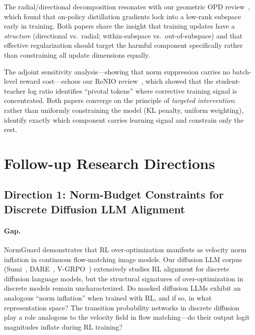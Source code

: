 \documentclass[11pt,a4paper]{article}
\begin{document}
The radial/directional decomposition resonates with our geometric OPD review~\cite{shen2026geometry}, which found that on-policy distillation gradients lock into a low-rank subspace early in training. Both papers share the insight that training updates have a \emph{structure} (directional vs.\ radial; within-subspace vs.\ out-of-subspace) and that effective regularization should target the harmful component specifically rather than constraining all update dimensions equally.

The adjoint sensitivity analysis---showing that norm suppression carries no batch-level reward cost---echoes our ReNIO review~\cite{lin2026renio}, which showed that the student-teacher log ratio identifies ``pivotal tokens'' where corrective training signal is concentrated. Both papers converge on the principle of \emph{targeted intervention}: rather than uniformly constraining the model (KL penalty, uniform weighting), identify exactly which component carries learning signal and constrain only the rest.

\section{Follow-up Research Directions}

\subsection{Direction 1: Norm-Budget Constraints for Discrete Diffusion LLM Alignment}

\paragraph{Gap.} NormGuard demonstrates that RL over-optimization manifests as velocity norm inflation in continuous flow-matching image models. Our diffusion LLM corpus (Sumi~\cite{chen2026sumi}, DARE~\cite{dare2026}, V-GRPO~\cite{vgrpo2026}) extensively studies RL alignment for discrete diffusion language models, but the structural signatures of over-optimization in discrete models remain uncharacterized. Do masked diffusion LLMs exhibit an analogous ``norm inflation'' when trained with RL, and if so, in what representation space? The transition probability networks in discrete diffusion play a role analogous to the velocity field in flow matching---do their output logit magnitudes inflate during RL training?
\end{document}
